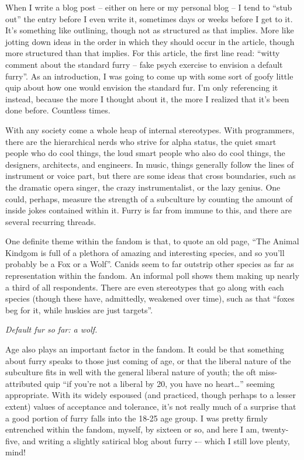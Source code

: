
When I write a blog post -- either on here or my personal blog -- I tend to ``stub out'' the entry before I even write it, sometimes days or weeks before I get to it.  It's something like outlining, though not as structured as that implies.  More like jotting down ideas in the order in which they should occur in the article, though more structured than that implies.  For this article, the first line read: ``witty comment about the standard furry -- fake psych exercise to envision a default furry''.  As an introduction, I was going to come up with some sort of goofy little quip about how one would envision the standard fur.  I'm only referencing it instead, because the more I thought about it, the more I realized that it's been done before.  Countless times.

With any society come a whole heap of internal stereotypes.  With programmers, there are the hierarchical nerds who strive for alpha status, the quiet smart people who do cool things, the loud smart people who also do cool things, the designers, architects, and engineers.  In music, things generally follow the lines of instrument or voice part, but there are some ideas that cross boundaries, such as the dramatic opera singer, the crazy instrumentalist, or the lazy genius.  One could, perhaps, measure the strength of a subculture by counting the amount of inside jokes contained within it.  Furry is far from immune to this, and there are several recurring threads.

One definite theme within the fandom is that, to quote an old page, “The Animal Kindgom is full of a plethora of amazing and interesting species, and so you'll probably be a Fox or a Wolf”.  Canids seem to far outstrip other species as far as representation within the fandom.  An informal poll shows them making up nearly a third of all respondents. There are even stereotypes that go along with each species (though these have, admittedly, weakened over time), such as that ``foxes beg for it, while huskies are just targets''.

\textit{Default fur so far: a wolf.}

Age also plays an important factor in the fandom.  It could be that something about furry speaks to those just coming of age, or that the liberal nature of the subculture fits in well with the general liberal nature of youth; the oft miss-attributed quip ``if you're not a liberal by 20,  you have no heart\ldots'' seeming appropriate.  With its widely espoused (and practiced, though perhaps to a lesser extent) values of acceptance and tolerance, it's not really much of a surprise that a good portion of furry falls into the 18-25 age group.  I was pretty firmly entrenched within the fandom, myself, by sixteen or so, and here I am, twenty-five, and writing a slightly satirical blog about furry -– which I still love plenty, mind!

